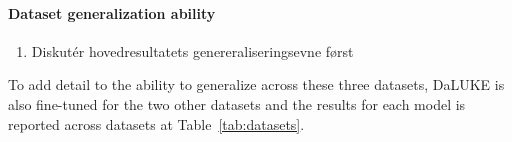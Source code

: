 \documentclass[main.tex]{subfiles}
\begin{document}
\paragraph{Dataset generalization ability}
\begin{enumerate}
    \item Diskutér hovedresultatets genereraliseringsevne først
\end{enumerate}
To add detail to the ability to generalize across these three datasets, DaLUKE is also fine-tuned for the two other datasets and the results for each model is reported across datasets at Table~\ref{tab:datasets}.








\end{document}
